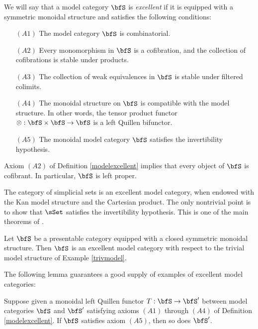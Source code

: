 \begin{Simplicial Categories}
\begin{definition}\label{modelexcellent}
We will say that a model category $\bfS$ is {\it excellent} if it is equipped with a symmetric
monoidal structure and satisfies the following conditions:
\begin{itemize}
\item[$(A1)$] The model category $\bfS$ is combinatorial.
\item[$(A2)$] Every monomorphism in $\bfS$ is a cofibration, and the collection of cofibrations
is stable under products.
\item[$(A3)$] The collection of weak equivalences in $\bfS$ is stable under filtered colimits.
\item[$(A4)$] The monoidal structure on $\bfS$ is compatible with the model structure.
In other words, the tensor product functor $\otimes: \bfS \times \bfS \rightarrow \bfS$ is a left Quillen bifunctor.
\item[$(A5)$] The monoidal model category $\bfS$ satisfies the invertibility hypothesis.
\end{itemize}
\end{definition}

\begin{remark}\label{dummu}
Axiom $(A2)$ of Definition \ref{modelexcellent} implies that every object of $\bfS$ is cofibrant.
In particular, $\bfS$ is left proper.
\end{remark}

\begin{example}\label{cuppata}
The category of simplicial sets is an excellent model category, when endowed with the Kan model structure and the Cartesian product. The only nontrivial point is to show that $\sSet$ satisfies the invertibility hypothesis. This is one of the main theorems of \cite{dwyerkan}.
\end{example}

\begin{example}
Let $\bfS$ be a presentable category equipped with a closed symmetric monoidal structure.
Then $\bfS$ is an excellent model category with respect to the trivial model structure
of Example \ref{trivmodel}.
\end{example}

The following lemma guarantees a good supply of examples of excellent model categories:

\begin{lemma}\label{cuppat}
Suppose given a monoidal left Quillen functor $T: \bfS \rightarrow \bfS'$
between model categories $\bfS$ and $\bfS'$ satisfying axioms
$(A1)$ through $(A4)$ of Definition \ref{modelexcellent}.
If $\bfS$ satisfies axiom $(A5)$, then so does $\bfS'$.
\end{lemma}


\end{Simplicial Categories}
